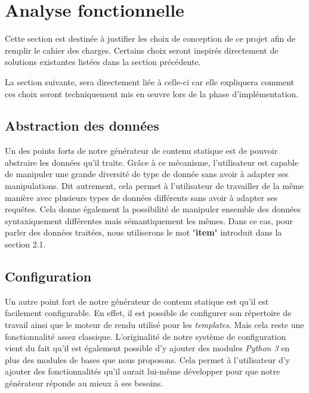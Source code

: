 \section{Analyse fonctionnelle}

	Cette section est destinée à justifier les choix de conception de ce projet afin de remplir le cahier des charges. Certains choix seront inspirés directement de solutions existantes listées dans la section précédente.
	
	La section suivante, sera directement liée à celle-ci car elle expliquera comment ces choix seront techniquement mis en œuvre lors de la phase d'implémentation.
	
	\subsection{Abstraction des données}
		Un des points forts de notre générateur de contenu statique est de pouvoir abstraire les données qu'il traite. Grâce à ce mécanisme, l'utilisateur est capable de manipuler une grande diversité de type de donnée sans avoir à adapter ses manipulations. Dit autrement, cela permet à l'utilisateur de travailler de la même manière avec plusieurs types de données différents sans avoir à adapter ses requêtes. Cela donne également la possibilité de manipuler ensemble des données  syntaxiquement différentes mais sémantiquement les mêmes. Dans ce cas, pour parler des données traitées, nous utiliserons le mot "\textbf{item}" introduit dans la section 2.1.
		
	\subsection{Configuration}
		Un autre point fort de notre générateur de contenu statique est qu'il est facilement configurable. En effet, il est possible de configurer son répertoire de travail ainsi que le moteur de rendu utilisé pour les \textit{templates}. Mais cela reste une fonctionnalité assez classique. L'originalité de notre système de configuration vient du fait qu'il est également possible d'y ajouter des modules \textit{Python 3} en plus des modules de bases que nous proposons. Cela permet à l'utilisateur d'y ajouter des fonctionnalités qu'il aurait lui-même développer pour que notre générateur réponde au mieux à ses besoins.
		

